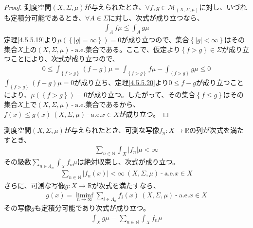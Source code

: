 \documentclass[dvipdfmx]{jsarticle}
\begin{document}
\begin{proof}
測度空間$(X,\varSigma,\mu)$が与えられたとき、$\forall f,g \in \mathcal{M}_{(X,\varSigma,\mu)}$に対し、いづれも定積分可能であるとき、$\forall A \in \varSigma$に対し、次式が成り立つなら、
\begin{align*}
\int_{A} {f\mu} \leq \int_{A} {g\mu}
\end{align*}
定理\ref{4.5.5.19}より$\mu\left( \left\{ |g| = \infty \right\} \right) = 0$が成り立つので、集合$\left\{ |g| < \infty \right\}$はその集合$X$上の$(X,\varSigma,\mu) \ \text{-} \ \mathrm{a.e.}$集合である。ここで、仮定より$\left\{ f > g \right\} \in \varSigma$が成り立つことにより、次式が成り立つので、
\begin{align*}
0 \leq \int_{\left\{ f > g \right\}} {(f - g)\mu} = \int_{\left\{ f > g \right\}} {f\mu} - \int_{\left\{ f > g \right\}} {g\mu} \leq 0
\end{align*}
$\int_{\left\{ f > g \right\}} {(f - g)\mu} = 0$が成り立ち、定理\ref{4.5.5.20}より$0 \leq f - g$が成り立つことにより、$\mu\left( \left\{ f > g \right\} \right) = 0$が成り立つ。したがって、その集合$\left\{ f \leq g \right\}$はその集合$X$上で$(X,\varSigma,\mu) \ \text{-} \ \mathrm{a.e.}$集合であるから、$f(x) \leq g(x)\ (X,\varSigma,\mu) \ \text{-} \ \mathrm{a.e.}x \in X$が成り立つ。
\end{proof}
\begin{thm}\label{4.6.3.7}
測度空間$(X,\varSigma,\mu)$が与えられたとき、可測な写像$f_{n}:X \rightarrow \mathbb{R}$の列が次式を満たすとき、
\begin{align*}
\sum_{n \in \mathbb{N}} {\int_{X} {\left| f_{n} \right|\mu}} < \infty
\end{align*}
その級数$\sum_{n \in \varLambda_{n}} {\int_{X} {f_{n}\mu}}$は絶対収束し、次式が成り立つ。
\begin{align*}
\sum_{n \in \mathbb{N}} \left| f_{n}(x) \right| < \infty\ (X,\varSigma,\mu) \ \text{-} \ \mathrm{a.e.}x \in X
\end{align*}
さらに、可測な写像$g:X \rightarrow \mathbb{R}$が次式を満たすなら、
\begin{align*}
g(x) = \liminf_{n \rightarrow \infty}{\sum_{i \in \varLambda_{n}} {f_{i}(x)}}\ (X,\varSigma,\mu) \ \text{-} \ \mathrm{a.e.}x \in X
\end{align*}
その写像$g$も定積分可能であり次式が成り立つ。
\begin{align*}
\int_{X} {g\mu} = \sum_{n \in \mathbb{N}} {\int_{X} {f_{n}\mu}}
\end{align*}
\end{thm}
\end{document}
